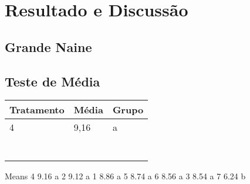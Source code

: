 \chapter{Resultado e Discussão}
\section{Grande Naine}

\section{Teste de Média}
  
 
 \begin{table}[htb]
 	\center
 	\footnotesize
 	\begin{tabular}{|p{1.4cm}|p{1cm}|p{3cm}}
 		\hline
 		\textbf{Tratamento} & \textbf{Média}  & \textbf{Grupo}\\
 		\hline
 		4 & 9,16 & a \\
 		&& \\
 		\hline
 		&& \\
		\hline
 		&& \\
		\hline
 		&& \\
		\hline
 		&& \\
		\hline
 		&& \\
		\hline
 		&& \\
		\hline
 	\end{tabular}
 \end{table}
  
  Means 
4  9.16  a   
2  9.12  a   
1  8.86  a   
5  8.74  a   
6  8.56  a   
3  8.54  a   
7  6.24     b